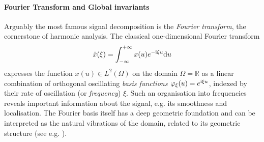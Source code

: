 \paragraph{Fourier Transform and Global invariants}
Arguably 
the most famous signal decomposition is the {\em Fourier transform}, the cornerstone of harmonic analysis. 
%
The classical one-dimensional Fourier transform  
$$
\hat{x}(\xi) = \int_{-\infty}^{+\infty} x(u) e^{-\mathrm{i} \xi u} \mathrm{d}u
$$
expresses the function $x(u) \in L^2(\Omega)$ on the domain $\Omega = \mathbb{R}$ as a linear combination 
of orthogonal oscillating {\em basis functions} $\varphi_\xi(u) = e^{\mathrm{i}\xi u}$, 
indexed 
by their rate of oscillation (or \emph{frequency}) $\xi$. Such an organisation into frequencies reveals important information about the signal, e.g. its smoothness and localisation. 
%
The Fourier basis itself has a deep geometric foundation and can be interpreted as the natural vibrations of the domain, related to its geometric structure (see e.g. \cite{berger2012panoramic}). 

